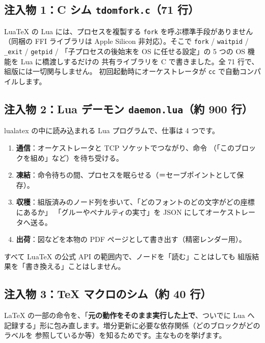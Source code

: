 \documentclass[11pt,a4paper]{ltjsarticle}
\newcommand{\code}[1]{\texttt{#1}}
\begin{document}
\subsection{注入物 1：C シム \code{tdomfork.c}（71 行）}

LuaTeX の Lua には、プロセスを複製する \code{fork} を呼ぶ標準手段がありません
（同梱の FFI ライブラリは Apple Silicon 非対応）。そこで
\code{fork} / \code{waitpid} / \code{\_exit} / \code{getpid} /
「子プロセスの後始末を OS に任せる設定」の 5 つの OS 機能を Lua に橋渡しするだけの
共有ライブラリを C で書きました。全 71 行で、組版には一切関与しません。
初回起動時にオーケストレータが \code{cc} で自動コンパイルします。

\subsection{注入物 2：Lua デーモン \code{daemon.lua}（約 900 行）}

lualatex の中に読み込まれる Lua プログラムで、仕事は 4 つです。

\begin{enumerate}
\item \textbf{通信}：オーケストレータと TCP ソケットでつながり、命令
  （「このブロックを組め」など）を待ち受ける。
\item \textbf{凍結}：命令待ちの間、プロセスを眠らせる（＝セーブポイントとして保存）。
\item \textbf{収穫}：組版済みのノード列を歩いて、「どのフォントのどの文字がどの座標にあるか」
  「グルーやペナルティの実寸」を JSON にしてオーケストレータへ送る。
\item \textbf{出荷}：図などを本物の PDF ページとして書き出す（精密レンダー用）。
\end{enumerate}

すべて LuaTeX の公式 API の範囲内で、ノードを「読む」ことはしても
組版結果を「書き換える」ことはしません。

\subsection{注入物 3：TeX マクロのシム（約 40 行）}

LaTeX の一部の命令を、「\textbf{元の動作をそのまま実行した上で}、ついでに Lua へ
記録する」形に包み直します。増分更新に必要な依存関係（どのブロックがどのラベルを
参照しているか等）を知るためです。主なものを挙げます。
\end{document}
